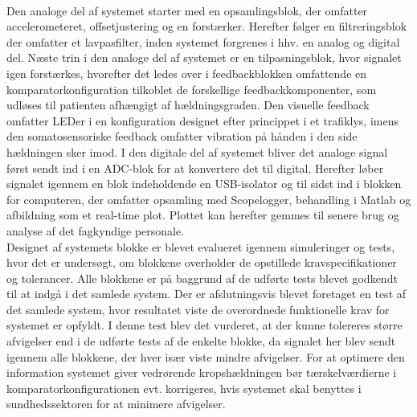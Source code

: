  \\
Den analoge del af systemet starter med en opsamlingsblok, der omfatter accelerometeret, offsetjustering og en forstærker. Herefter følger en filtreringsblok der omfatter et lavpasfilter, inden systemet forgrenes i hhv. en analog og digital del. Næste trin i den analoge del af systemet er en tilpasningsblok, hvor signalet igen forstærkes, hvorefter det ledes over i feedbackblokken omfattende en komparatorkonfiguration tilkoblet de forskellige feedbackkomponenter, som udløses til patienten afhængigt af hældningsgraden. Den visuelle feedback omfatter LEDer i en konfiguration designet efter princippet i et trafiklys, imens den somatosensoriske feedback omfatter vibration på hånden i den side hældningen sker imod. 
I den digitale del af systemet bliver det analoge signal først sendt ind i en ADC-blok for at konvertere det til digital. Herefter løber signalet igennem en blok indeholdende en USB-isolator og til sidst ind i blokken for computeren, der omfatter opsamling med Scopelogger, behandling i Matlab og afbildning som et real-time plot. Plottet kan herefter gemmes til senere brug og analyse af det fagkyndige personale. \\
Designet af systemets blokke er blevet evalueret igennem simuleringer og tests, hvor det er undersøgt, om blokkene overholder de opstillede kravspecifikationer og tolerancer. Alle blokkene er på baggrund af de udførte tests blevet godkendt til at indgå i det samlede system. Der er afslutningsvis blevet foretaget en test af det samlede system, hvor resultatet viste de overordnede funktionelle krav for systemet er opfyldt. I denne test blev det vurderet, at der kunne tolereres større afvigelser end i de udførte tests af de enkelte blokke, da signalet her blev sendt igennem alle blokkene, der hver især viste mindre afvigelser. For at optimere den information systemet giver vedrørende kropshældningen bør tærskelværdierne i komparatorkonfigurationen evt. korrigeres, hvis systemet skal benyttes i sundhedssektoren for at minimere afvigelser.  


\clearpage